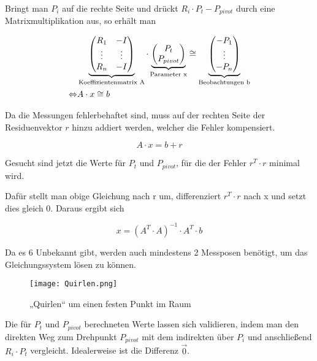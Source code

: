 \documentclass[11pt, a4paper]{article}
\begin{document}
Bringt man $P_i$ auf die rechte Seite und drückt $R_i \cdot P_t - P_{pivot}$ durch eine Matrixmultiplikation aus, so erhält man

\begin{eqnarray*}
&\underbrace{
\begin{pmatrix}
R_1 & -I \\ \vdots & \vdots \\ R_n & -I
\end{pmatrix}}_{\textnormal{Koeffizientenmatrix A}} \cdot
\underbrace{
\begin{pmatrix}
P_t \\ P_{pivot}
\end{pmatrix}}_{\textnormal{Parameter x}}
\cong
\underbrace{
\begin{pmatrix}
-P_1 \\ \vdots \\ -P_n
\end{pmatrix}}_{\textnormal{Beobachtungen b}}\\
\Leftrightarrow & A \cdot x \cong b
\end{eqnarray*}

Da die Messungen fehlerbehaftet sind, muss auf der rechten Seite der Residuenvektor $r$ hinzu addiert werden, welcher die Fehler kompensiert.

\begin{equation*}
A \cdot x = b + r
\end{equation*}

Gesucht sind jetzt die Werte für $P_t$ und $P_{pivot}$, für die der Fehler $r^T \cdot r$ minimal wird.

Dafür stellt man obige Gleichung nach r um, differenziert $r^T \cdot r$ nach x und setzt dies gleich 0. Daraus ergibt sich

\begin{equation}
x = (A^T \cdot A)^{-1} \cdot A^T \cdot b
\end{equation}

Da es 6 Unbekannt gibt, werden auch mindestens 2 Messposen benötigt, um das Gleichungssystem lösen zu können.

\begin{figure}[H]
	\centering\texttt{[image: Quirlen.png]}
	\caption{„Quirlen“ um einen festen Punkt im Raum}
\end{figure}

Die für $P_t$ und $P_{pivot}$ berechneten Werte lassen sich validieren, indem man den direkten Weg zum Drehpunkt $P_{pivot}$ mit dem indirekten über $P_i$ und anschließend $R_i \cdot P_t$ vergleicht. Idealerweise ist die Differenz $\vec{0}$.
\end{document}
